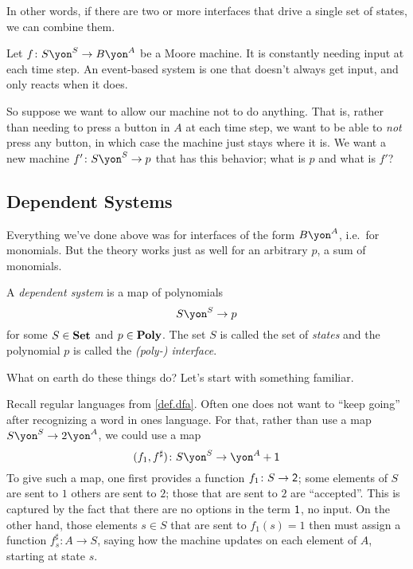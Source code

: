 \documentclass[DynamicalBook]{subfiles}
\begin{document}
In other words, if there are two or more interfaces that drive a single set of states, we can combine them.



\begin{exercise}
Let $f\colon S\yon^S\to B\yon^A$ be a Moore machine. It is constantly needing input at each time step. An event-based system is one that doesn't always get input, and only reacts when it does.

So suppose we want to allow our machine not to do anything. That is, rather than needing to press a button in $A$ at each time step, we want to be able to \emph{not} press any button, in which case the machine just stays where it is. We want a new machine $f'\colon S\yon^S\to p$ that has this behavior; what is $p$ and what is $f'$?
\end{exercise}



\subsection{Dependent Systems}

Everything we've done above was for interfaces of the form $B\yon^A$, i.e.\ for monomials. But the theory works just as well for an arbitrary $p$, a sum of monomials.

\begin{definition}\label{def.gen_moore}
A \emph{dependent system} is a map of polynomials
\[S\yon^S\to p\]
for some $S\in\textbf{Set}$ and $p\in\textbf{Poly}$. The set $S$ is called the set of \emph{states} and the polynomial $p$ is called the \emph{(poly-) interface}.
\end{definition}

What on earth do these things do? Let's start with something familiar.

\begin{example}\label{ex.regular_lang_stop}
Recall regular languages from \cref{def.dfa}. Often one does not want to ``keep going'' after recognizing a word in ones language. For that, rather than use a map $S\yon^S\to 2\yon^A$, we could use a map
\[
(f_1,f^\sharp)\colon S\yon^S\to \yon^A+\1
\]
To give such a map, one first provides a function $f_1\colon S\to\textsf{2}$; some elements of $S$ are sent to $1$ others are sent to $2$; those that are sent to $2$ are ``accepted''. This is captured by the fact that there are no options in the term $\textsf{1}$, no input. On the other hand, those elements $s\in S$ that are sent to $f_1(s)=1$ then must assign a function $f^\sharp_s\colon A\to S$, saying how the machine updates on each element of $A$, starting at state $s$.
\end{example}
\end{document}
